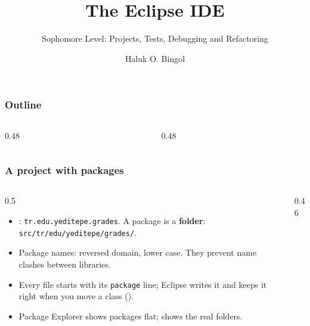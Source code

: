 \documentclass[aspectratio=169,10pt,compress]{beamer}
\title{The Eclipse IDE}
\subtitle{Sophomore Level: Projects, Tests, Debugging and Refactoring}
\author[Bingol]{Haluk O. Bingol}
\institute[FCIS]{
    Faculty of Computer and Information Sciences\\
    Yeditepe University
}
\date{
	{\tiny \hbTimeStamp}
}
\begin{document}
\begin{frame}[t,fragile]
  \titlepage
\end{frame}




\begin{frame}[t,fragile] \frametitle{Outline}
  \begin{columns}[T]
    \begin{column}{0.48\textwidth}
      \tableofcontents[sections={1-4}, hideallsubsections]
    \end{column}
    \begin{column}{0.48\textwidth}
      \tableofcontents[sections={5-8}, hideallsubsections]
    \end{column}
  \end{columns}
\end{frame}





\begin{frame}[t,fragile] \frametitle{A project with packages}
  \begin{columns}[T]
    \begin{column}{0.5\textwidth}
      \begin{itemize}\small
        \item {}: \texttt{tr.edu.yeditepe.grades}. A package is a \textbf{folder}:
              \texttt{src/tr/edu/yeditepe/grades/}.
        \item Package names: reversed domain, lower case. They prevent name clashes between libraries.
        \item Every file starts with its \texttt{package} line; Eclipse writes it and keeps it right when you
              move a class ().
        \item Package Explorer shows packages flat;  shows the real folders.
      \end{itemize}
    \end{column}
    \begin{column}{0.46\textwidth}
    \end{column}
  \end{columns}
\end{frame}
\end{document}
